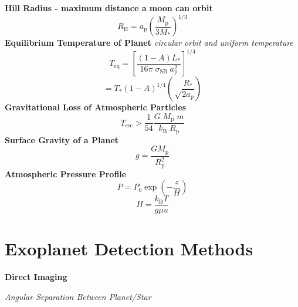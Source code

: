 \documentclass{article}
\begin{document}
\textbf {Hill Radius - maximum distance a moon can orbit}
\begin{equation}
R_\mathrm{H} = a_\mathrm{p} \left( \frac{M_\mathrm{p}}{3M_\mathrm{*}} \right)^{1/3}
\end{equation}
\textbf {Equilibrium Temperature of Planet}
\textit {circular orbit and uniform temperature}
\begin{equation}
T_\mathrm{eq} = \left[ \frac {\left(1-A\right)L_\mathrm{*}} {16 \pi \; \sigma_\mathrm{SB} \; a_\mathrm{p}^2} \right]^{1/4} 
\end{equation}
\begin{equation}
= T_\mathrm{*} \left(1-A\right)^{1/4} \left(\sqrt \frac {R_\mathrm{*}}{2a_\mathrm{p}} \right)
\end{equation}
\textbf {Gravitational Loss of Atmospheric Particles}
\begin{equation}
T_\mathrm{esc} > \frac {1}{54} \frac {G \; M_\mathrm{p} \; m}{k_\mathrm{B} \; R_\mathrm{p}}
\end{equation}
\textbf {Surface Gravity of a Planet}
\begin{equation}
g = \frac{G M_\mathrm{p}}{R^2_\mathrm{p}}
\end{equation}
\textbf {Atmospheric Pressure Profile}
\begin{equation}
P = P_\mathrm{0} \exp \left( -\frac{z}{H} \right)
\end{equation}
\begin{equation}
H = \frac{k_\mathrm{B}T}{g \mu u}
\end{equation}
\newpage

\section {Exoplanet Detection Methods}
\textbf{Direct Imaging}

\textit{Angular Separation Between Planet/Star}
\end{document}
